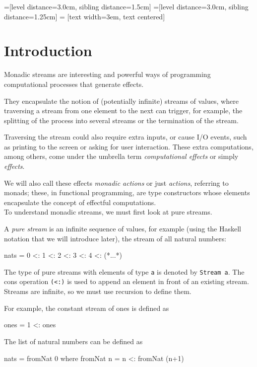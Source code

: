 =[level distance=3.0cm, sibling distance=1.5cm]
=[level distance=3.0cm, sibling distance=1.25cm]
 = [text width=3em, text centered]

\section{Introduction}

Monadic streams are interesting and powerful ways of programming computational processes that generate effects. 

They encapsulate the notion of (potentially infinite) streams of values,
where traversing a stream from one element to the next 
can trigger, for example,
the splitting of the process into several streams
or the termination of the stream.

 Traversing the stream could also require extra inputs, or cause I/O events, such as printing to the screen or asking for user interaction. These extra computations, among others, come under the umbrella term \emph{computational effects} or simply \emph{effects}. 

We will also call these effects \emph{monadic actions} or just \emph{actions}, referring to monads; these, in functional programming, are type constructors whose elements encapsulate the concept of effectful computations. \\

To understand monadic streams, we must first look at pure streams.

A \emph{pure stream} is an infinite sequence of values, for example (using the Haskell notation that we will introduce later), the stream of all natural numbers:
\begin{haskell}
  nats = 0 <: 1 <: 2 <: 3 <: 4 <: (*...*)
\end{haskell}
The type of pure streams with elements of type \verb+a+ is denoted by \verb+Stream a+. The cons operation \verb+(<:)+ is used to append an element in front of an existing stream. Streams are infinite, so we must use recursion to define them.

For example, the constant stream of ones is defined as
\begin{haskell}
  ones = 1 <: ones
\end{haskell}

The list of natural numbers can be defined as
\begin{haskell}
  nats = fromNat 0
    where fromNat n = n <: fromNat (n+1)
\end{haskell}


